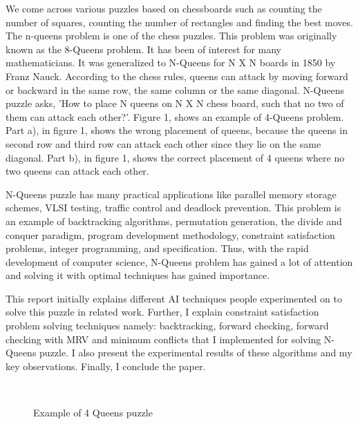 \documentclass[conference]{IEEEtran}
\begin{document}
We come across various puzzles based on chessboards such as counting the number of squares, counting the number of rectangles and finding the best moves. The n-queens problem is one of the chess puzzles. This problem was originally known as the 8-Queens problem. It has been of interest for many mathematicians. It was generalized to N-Queens for N X N boards in 1850 by Franz Nauck. According to the chess rules, queens can attack by moving forward or backward in the same row, the same column or the same diagonal. N-Queens puzzle asks, 'How to place N queens on N X N chess board, such that no two of them can attack each other?'. Figure 1, shows an example of 4-Queens problem. Part a), in figure 1, shows the wrong placement of queens, because the queens in second row and third row can attack each other since they lie on the same diagonal. Part b), in figure 1, shows the correct placement of 4 queens where no two queens can attack each other. 
\par N-Queens puzzle has many practical applications like parallel memory storage schemes, VLSI testing, traffic control and deadlock prevention. This problem is an example of  backtracking algorithms, permutation generation, the divide and conquer paradigm, program development methodology, constraint satisfaction problems, integer programming, and specification. Thus, with the rapid development of computer science, N-Queens problem has gained a lot of attention and solving it with optimal techniques has gained importance.
\par This report initially explains different AI techniques people experimented on to solve this puzzle in related work. Further, I explain constraint satisfaction problem solving techniques namely: backtracking, forward checking, forward checking with MRV and minimum conflicts that I implemented for solving N-Queens puzzle. I also present the experimental results of these algorithms and my key observations. Finally, I conclude the paper.

\begin{figure}%
    \centering
    \label{Figure6}
    \qquad
    \\
    \centering
 
    \label{Figure7}
\label{figure1}
\caption{Example of 4 Queens puzzle}
\end{figure}
\end{document}

